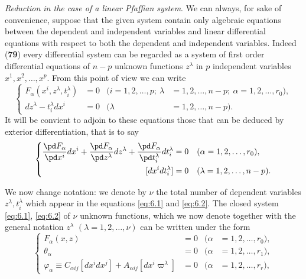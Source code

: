 \vspace{12pt}\fsec \emph{Reduction in the case of a linear Pfaffian system}. We can always, for sake of convenience, suppose that the given system contain only algebraic equations between the dependent and independent variables and linear differential equations with respect to both the dependent and independent variables. Indeed (\textsection\textbf{79}) every differential system can be regarded as a system of first order differential equations of $n-p$ unknown functions $z^{\lambda}$ in $p$ independent variables $x^{1},x^{2},\dots,x^{p}$. From this point of view we can write
\begin{equation}
  \label{eq:6.1}
  \left\{
    \begin{aligned}
      F_{\alpha}(x^{i},z^{\lambda},t_{i}^{\lambda})&=0&(i=1,2,\dots,p;\ \lambda&=1,2,\dots,n-p;\ \alpha=1,2,\dots,r_{0}),\\
      dz^{\lambda}-t_{i}^{\lambda}dx^{i}&=0&(\lambda&=1,2,\dots,n-p).
    \end{aligned}
  \right.
\end{equation}
It will be convient to adjoin to these equations those that can be deduced by exterior differentiation, that is to say
\begin{equation}
  \label{eq:6.2}
  \left\{
    \begin{aligned}
      \frac{\pd F_{\alpha}}{\pd x^{i}}dx^{i}+\frac{\pd F_{\alpha}}{\pd z^{\lambda}}dz^{\lambda}+\frac{\pd F_{\alpha}}{\pd t_{i}^{\lambda}}dt_{i}^{\lambda}&=0&&(\alpha=1,2,\dots,r_{0}),\\
    [dx^{i}dt_{i}^{\lambda}]&=0&&(\lambda=1,2,\dots,n-p).
  \end{aligned}
  \right.
\end{equation}

We now change notation: we denote by $\nu$ the total number of dependent variables $z^{\lambda}, t_{i}^{\lambda}$ which appear in the equations \eqref{eq:6.1} and \eqref{eq:6.2}. The closed system \eqref{eq:6.1}, \eqref{eq:6.2} of $\nu$ unknown functions, which we now denote together with the general notation $z^{\lambda}$ $(\lambda=1,2,\dots,\nu)$ can be written under the form
\begin{equation}
  \label{eq:6.3}
  \left\{
    \begin{aligned}
      F_{\alpha}(x,z)&=0&(\alpha&=1,2,\dots,r_{0}),\\
      \theta_{\alpha}&=0&(\alpha&=1,2,\dots,r_{1}),\\
      \varphi_{\alpha}\equiv C_{\alpha ij}[dx^{i}dx^{j}]+A_{\alpha ij}[dx^{i}\varpi^{\lambda}]&=0&(\alpha&=1,2,\dots,r_{r}),
    \end{aligned}
  \right.
\end{equation}

